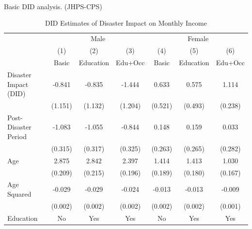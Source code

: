 \documentclass[serif, aspectratio=169]{beamer}
\begin{document}
\begin{frame}

Basic DID analysis. (JHPS-CPS)

\begin{table}[htbp]
\centering
\caption{DID Estimates of Disaster Impact on Monthly Income}

\begin{tabular}{@{}l*{6}{c}@{}}
          &\multicolumn{3}{c}{Male}                                &\multicolumn{3}{c}{Female}                              \\\cmidrule(lr){2-4}\cmidrule(lr){5-7}
          &\multicolumn{1}{c}{(1)}&\multicolumn{1}{c}{(2)}&\multicolumn{1}{c}{(3)}&\multicolumn{1}{c}{(4)}&\multicolumn{1}{c}{(5)}&\multicolumn{1}{c}{(6)}\\
          &\multicolumn{1}{c}{Basic}&\multicolumn{1}{c}{Education}&\multicolumn{1}{c}{Edu+Occ}&\multicolumn{1}{c}{Basic}&\multicolumn{1}{c}{Education}&\multicolumn{1}{c}{Edu+Occ}\\
\toprule
Disaster Impact (DID)&   -0.841         &   -0.835         &   -1.444         &    0.633         &    0.575         &    1.114\sym{***}\\
          &  (1.151)         &  (1.132)         &  (1.204)         &  (0.521)         &  (0.493)         &  (0.238)         \\
\addlinespace
Post-Disaster Period&   -1.083\sym{***}&   -1.055\sym{***}&   -0.844\sym{**} &    0.148         &    0.159         &    0.033         \\
          &  (0.315)         &  (0.317)         &  (0.325)         &  (0.263)         &  (0.265)         &  (0.282)         \\
\addlinespace
Age       &    2.875\sym{***}&    2.842\sym{***}&    2.397\sym{***}&    1.414\sym{***}&    1.413\sym{***}&    1.030\sym{***}\\
          &  (0.209)         &  (0.215)         &  (0.196)         &  (0.189)         &  (0.180)         &  (0.167)         \\
\addlinespace
Age Squared&   -0.029\sym{***}&   -0.029\sym{***}&   -0.024\sym{***}&   -0.013\sym{***}&   -0.013\sym{***}&   -0.009\sym{***}\\
          &  (0.002)         &  (0.002)         &  (0.002)         &  (0.002)         &  (0.002)         &  (0.001)         \\
\midrule
Education &       No         &      Yes         &      Yes         &       No         &      Yes         &      Yes         \\

\end{tabular}
\end{table}
\end{frame}
\end{document}
